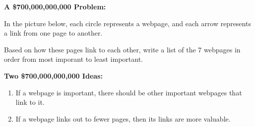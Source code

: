 
\begin{applicationActivities}{5}{29}

\begin{activity}{10}

\textbf{A \$700,000,000,000 Problem:}

In the picture below, each circle represents a webpage, and each arrow
represents a link from one page to another.

\begin{center}
\end{center}

Based on how these pages link to each other,
write a list of the 7 webpages in order from
most imporant to least important.
\end{activity}

\begin{observation}
\textbf{Two \$700,000,000,000 Ideas:}

\begin{enumerate}
\item
If a webpage is important, there should be other important webpages that
link to it.

\item
If a webpage links out to fewer pages, then its links are more valuable.
\end{enumerate}
\end{observation}


\end{applicationActivities}

